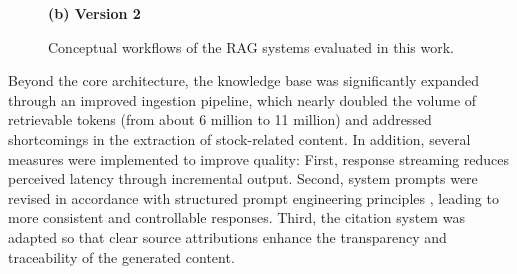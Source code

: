 \begin{figure}[htbp]
\begin{minipage}{\textwidth}

\vspace{0.4em}
\textbf{(b) Version 2}
\end{minipage}

\caption{Conceptual workflows of the RAG systems evaluated in this work.}
\label{fig:workflow_vergleich}
\end{figure}

Beyond the core architecture, the knowledge base was significantly expanded through an improved ingestion pipeline, which nearly doubled the volume of retrievable tokens (from about 6 million to 11 million) and addressed shortcomings in the extraction of stock-related content. In addition, several measures were implemented to improve quality: First, response streaming reduces perceived latency through incremental output. Second, system prompts were revised in accordance with structured prompt engineering principles \autocite{Lee2025PromptEngineering}, leading to more consistent and controllable responses. Third, the citation system was adapted so that clear source attributions enhance the transparency and traceability of the generated content.